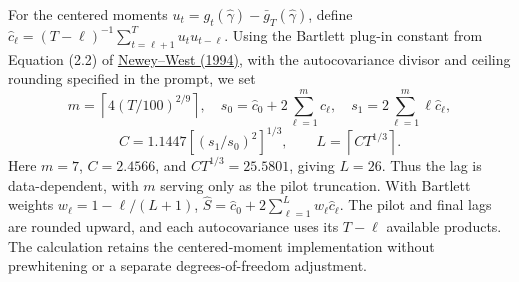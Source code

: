 For the centered moments $u_t=g_t(\hat\gamma)-\bar g_T(\hat\gamma)$,
define $\hat c_\ell=(T-\ell)^{-1}\sum_{t=\ell+1}^T u_tu_{t-\ell}$.
Using the Bartlett plug-in constant from Equation (2.2) of
\href{https://doi.org/10.2307/2297912}{Newey--West (1994)},
with the autocovariance divisor and ceiling rounding specified in the prompt, we set
\[
  m=\left\lceil4(T/100)^{2/9}\right\rceil,\quad
  s_0=\hat c_0+2\sum_{\ell=1}^{m}\hat c_\ell,\quad
  s_1=2\sum_{\ell=1}^{m}\ell\hat c_\ell,
\]
\[
  C=1.1447\left[(s_1/s_0)^2\right]^{1/3},\qquad
  L=\left\lceil CT^{1/3}\right\rceil.
\]
Here $m=7$, $C=2.4566$, and $CT^{1/3}=25.5801$, giving $L=26$.
Thus the lag is data-dependent, with $m$ serving only as the pilot truncation.
With Bartlett weights $w_\ell=1-\ell/(L+1)$,
$\hat S=\hat c_0+2\sum_{\ell=1}^{L}w_\ell\hat c_\ell$.
The pilot and final lags are rounded upward, and each autocovariance
uses its $T-\ell$ available products. The calculation retains the
centered-moment implementation without prewhitening or a separate
degrees-of-freedom adjustment.
